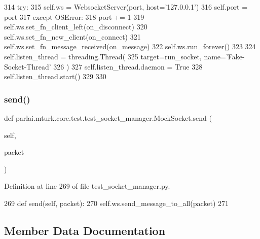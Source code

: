 \begin{DoxyCode}
314                 \textcolor{keywordflow}{try}:
315                     self.ws = WebsocketServer(port, host=\textcolor{stringliteral}{'127.0.0.1'})
316                     self.port = port
317                 \textcolor{keywordflow}{except} OSError:
318                     port += 1
319             self.ws.set\_fn\_client\_left(on\_disconnect)
320             self.ws.set\_fn\_new\_client(on\_connect)
321             self.ws.set\_fn\_message\_received(on\_message)
322             self.ws.run\_forever()
323 
324         self.listen\_thread = threading.Thread(
325             target=run\_socket, name=\textcolor{stringliteral}{'Fake-Socket-Thread'}
326         )
327         self.listen\_thread.daemon = \textcolor{keyword}{True}
328         self.listen\_thread.start()
329 
330 
\end{DoxyCode}
\mbox{\label{classparlai_1_1mturk_1_1core_1_1test_1_1test__socket__manager_1_1MockSocket_a476b7c95ab63d6c5a43025f8edddf07a}} 
\subsubsection{\texorpdfstring{send()}{send()}}
{\footnotesize\ttfamily def parlai.\+mturk.\+core.\+test.\+test\+\_\+socket\+\_\+manager.\+Mock\+Socket.\+send (\begin{DoxyParamCaption}\item[{}]{self,  }\item[{}]{packet }\end{DoxyParamCaption})}



Definition at line 269 of file test\+\_\+socket\+\_\+manager.\+py.


\begin{DoxyCode}
269     \textcolor{keyword}{def }send(self, packet):
270         self.ws.send\_message\_to\_all(packet)
271 
\end{DoxyCode}


\subsection{Member Data Documentation}
\mbox{\label{classparlai_1_1mturk_1_1core_1_1test_1_1test__socket__manager_1_1MockSocket_a780461a398bbc8e99b6a149921e16f4d}} 
